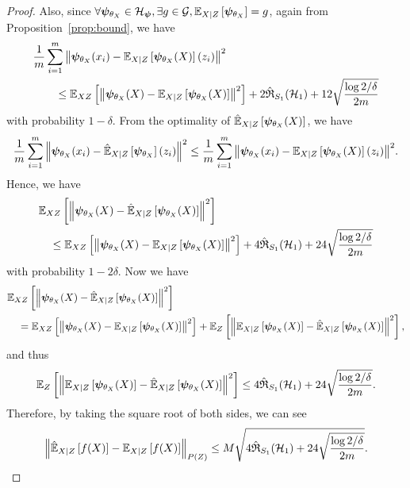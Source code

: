 \begin{proof}
Also, since $ \forall \vec{\psi}_{\theta_X} \in \mathcal{H}_{\vec{\psi}}, \exists g\in \mathcal{G}, \expect[X|Z]{\vec{\psi}_{\theta_X}} = g$, again from Proposition~\ref{prop:bound}, we have
\begin{align*}
    &\frac1m \sum_{i=1}^m {\left\|\vec{\psi}_{{\theta}_X}(x_i)- \expect[X|Z]{\vec{\psi}_{{\theta}_X}(X)}(z_i)\right\|^2} \nonumber\\
    &\quad\quad \leq   \expect[XZ]{\left\|\vec{\psi}_{{\theta}_X}(X) - \expect[X|Z]{\vec{\psi}_{{\theta}_X}(X)}\right\|^2} +  2\hat{\mathfrak{R}}_{S_1}(\mathcal{H}_1) + 12\sqrt{\frac{\log 2/\delta}{2m}}
\end{align*}
with probability $1-\delta$. From the optimality of $\hatexpect[X|Z]{\vec{\psi}_{\theta_X}(X)}$, we have
\begin{align*}
    \frac1m \sum_{i=1}^m {\left\|\vec{\psi}_{{\theta}_X}(x_i)- \hatexpect[X|Z]{\vec{\psi}_{{\theta}_X}}(z_i)\right\|^2} \leq  \frac1m \sum_{i=1}^m {\left\|\vec{\psi}_{{\theta}_X}(x_i)- \expect[X|Z]{\vec{\psi}_{{\theta}_X}(X)}(z_i)\right\|^2}.
\end{align*}
Hence, we have
\begin{align*}
    &\expect[XZ]{\left\|\vec{\psi}_{{\theta}_X}(X) - \hatexpect[X|Z]{\vec{\psi}_{{\theta}_X}(X)}\right\|^2} \nonumber\\
    &\quad \leq  \expect[XZ]{\left\|\vec{\psi}_{{\theta}_X}(X) - \expect[X|Z]{\vec{\psi}_{{\theta}_X}(X)}\right\|^2} +  4\hat{\mathfrak{R}}_{S_1}(\mathcal{H}_1) + 24\sqrt{\frac{\log 2/\delta}{2m}}
\end{align*}
with probability $1-2\delta$.
Now we have 
\begin{align*}
    &\expect[XZ]{\left\|\vec{\psi}_{{\theta}_X}(X) - \hatexpect[X|Z]{\vec{\psi}_{{\theta}_X}(X)}\right\|^2} \\
    &\quad =\expect[XZ]{\left\|\vec{\psi}_{{\theta}_X}(X) - \expect[X|Z]{\vec{\psi}_{{\theta}_X}(X)}\right\|^2} + \expect[Z]{\left\|\expect[X|Z]{\vec{\psi}_{{\theta}_X}(X)} - \hatexpect[X|Z]{\vec{\psi}_{{\theta}_X}(X)}\right\|^2},
\end{align*}
and thus
\begin{align*}
    \expect[Z]{\left\|\expect[X|Z]{\vec{\psi}_{{\theta}_X}(X)} - \hatexpect[X|Z]{\vec{\psi}_{{\theta}_X}(X)}\right\|^2} \leq 4\hat{\mathfrak{R}}_{S_1}(\mathcal{H}_1) + 24\sqrt{\frac{\log 2/\delta}{2m}}.
\end{align*}
Therefore, by taking the square root of both sides, we can see
\begin{align*}
    \left\|\hatexpect[X|Z]{{f}(X)} - \expect[X|Z]{{f}(X)}\right\|_{P(Z)} \leq M\sqrt{4\hat{\mathfrak{R}}_{S_1}(\mathcal{H}_1) + 24\sqrt{\frac{\log 2/\delta}{2m}}}.
\end{align*}
\end{proof}

